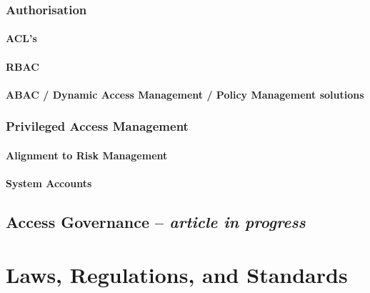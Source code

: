 \hypertarget{authorisation}{%
\subsection{Authorisation}\label{authorisation}}

\hypertarget{acls}{%
\subsubsection{ACL's}\label{acls}}

\hypertarget{rbac}{%
\subsubsection{RBAC}\label{rbac}}

\hypertarget{abac-dynamic-access-management-policy-management-solutions}{%
\subsubsection{ABAC / Dynamic Access Management / Policy Management
solutions}\label{abac-dynamic-access-management-policy-management-solutions}}

\hypertarget{privileged-access-management}{%
\subsection{Privileged Access
Management}\label{privileged-access-management}}

\hypertarget{alignment-to-risk-management}{%
\subsubsection{Alignment to Risk
Management}\label{alignment-to-risk-management}}

\hypertarget{system-accounts}{%
\subsubsection{System Accounts}\label{system-accounts}}

\hypertarget{access-governance-article-in-progress}{%
\section{\texorpdfstring{Access Governance -- \emph{article in
progress}}{Access Governance -- article in progress}}\label{access-governance-article-in-progress}}

\hypertarget{laws-regulations-and-standards}{%
\chapter{Laws, Regulations, and
Standards}\label{laws-regulations-and-standards}}

